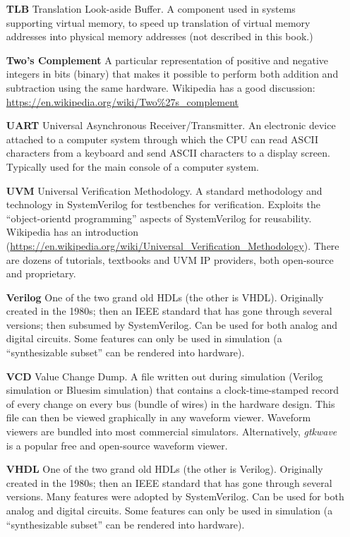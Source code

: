 \begin{itemize}
\item[\bf TLB] Translation Look-aside Buffer.  A component used in
  systems supporting virtual memory, to speed up translation of
  virtual memory addresses into physical memory addresses (not
  described in this book.)

\item[\bf Two's Complement] A particular representation of positive
  and negative integers in bits (binary) that makes it possible to
  perform both addition and subtraction using the same
  hardware. Wikipedia has a good discussion:
  \url{https://en.wikipedia.org/wiki/Two%27s_complement}

\item[\bf UART] Universal Asynchronous Receiver/Transmitter.  An
  electronic device attached to a computer system through which the
  CPU can read ASCII characters from a keyboard and send ASCII
  characters to a display screen.  Typically used for the main console
  of a computer system.

\item[\bf UVM] Universal Verification Methodology.  A standard
  methodology and technology in SystemVerilog for testbenches for
  verification. Exploits the ``object-orientd programming'' aspects of
  SystemVerilog for reusability. Wikipedia has an introduction
  (\url{https://en.wikipedia.org/wiki/Universal_Verification_Methodology}).
  There are dozens of tutorials, textbooks and UVM IP providers, both
  open-source and proprietary.

\item[\bf Verilog] One of the two grand old HDLs (the other is VHDL).
  Originally created in the 1980s; then an IEEE standard that has gone
  through several versions; then subsumed by SystemVerilog.  Can be
  used for both analog and digital circuits.  Some features can only
  be used in simulation (a ``synthesizable subset'' can be rendered
  into hardware).

\item[\bf VCD] Value Change Dump.  A file written out during
  simulation (Verilog simulation or Bluesim simulation) that contains
  a clock-time-stamped record of every change on every bus (bundle of
  wires) in the hardware design.  This file can then be viewed
  graphically in any waveform viewer.  Waveform viewers are bundled
  into most commercial simulators. Alternatively, \emph{gtkwave} is a
  popular free and open-source waveform viewer.

\item[\bf VHDL] One of the two grand old HDLs (the other is Verilog).
  Originally created in the 1980s; then an IEEE standard that has gone
  through several versions. Many features were adopted by
  SystemVerilog.  Can be used for both analog and digital circuits.
  Some features can only be used in simulation (a ``synthesizable
  subset'' can be rendered into hardware).

\end{itemize}

